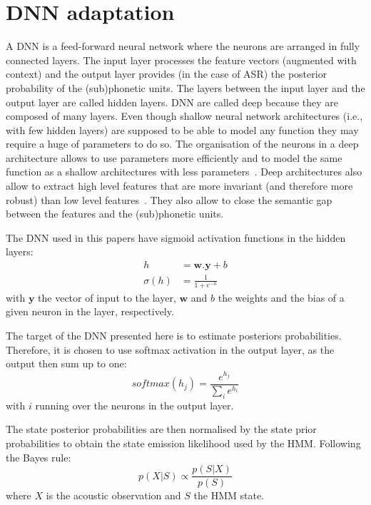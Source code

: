 \documentclass{nle}
\begin{document}
\section{DNN adaptation}\label{section:DNN}
A DNN is a feed-forward neural network where the neurons are arranged in fully connected layers. The input layer processes the feature vectors (augmented with context) and the output layer provides (in the case of ASR) the posterior probability of the (sub)phonetic units. The layers between the input layer and the output layer are called hidden layers. DNN are called deep because they are composed of many layers. Even though shallow neural network architectures (i.e., with few hidden layers) are supposed to be able to model any function they may require a huge of parameters to do so. The organisation of the neurons in a deep architecture allows to use parameters more efficiently and to model the same function as a shallow architectures with less parameters~\citep*{bengio2013representation}. Deep architectures also allow to extract high level features that are more invariant (and therefore more robust) than low level features~\citep{hinton12}. They also allow to close the semantic gap between the features and the (sub)phonetic units. 

The DNN used in this papers have sigmoid activation functions in the hidden layers:
\begin{align}
h & = \textbf{w}.\textbf{y} + b \nonumber\\
  \sigma(h) & = \frac{1}{1+ e^{-h} }\nonumber
\end{align}
with $\textbf{y}$ the vector of input to the layer,  $\textbf{w}$ and $b$ the weights and the bias of a given neuron in  the layer, respectively.

The target of the DNN presented here is to estimate posteriors probabilities. Therefore, it is chosen to use softmax activation in the output layer, as the output then sum up to one:
\begin{equation}
 softmax(h_j)=\frac{e^{h_j}}{\sum\limits_i e^{h_i}}\nonumber
\end{equation}
with $i$ running over the neurons in the output layer.

The state posterior probabilities are then normalised by the state prior probabilities to obtain the state emission likelihood used by the HMM. Following the Bayes rule:
\begin{equation}
 p(X|S)\propto \frac{p(S|X)}{p(S)} \nonumber
\end{equation}
where $X$ is the acoustic observation and $S$ the HMM state.
\end{document}
